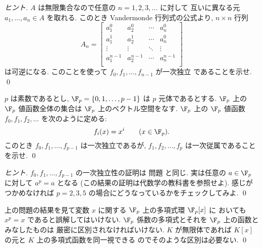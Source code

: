 \documentclass[12pt,twoside]{jarticle}
\begin{document}
\begin{proof}[ヒント]
  $A$ は無限集合なので任意の $n=1,2,3,\ldots$ に対して
  互いに異なる元 $a_1,\ldots,a_n\in A$ を取れる.
  このとき Vandermonde 行列式の公式より, $n\times n$ 行列
  \begin{equation*}
    A_n = 
    \begin{bmatrix}
      a_1^0     & a_2^0     & \cdots & a_n^0     \\
      a_1^1     & a_2^1     & \cdots & a_n^0     \\
      \vdots    & \vdots    & \ddots & \vdots    \\
      a_1^{n-1} & a_2^{n-1} & \cdots & a_n^{n-1} \\
    \end{bmatrix}
  \end{equation*}
  は可逆になる. このことを使って $f_0,f_1,\ldots,f_{n-1}$ が一次独立
  であることを示せ. \qed
\end{proof}

\begin{question}[15点]
  $p$ は素数であるとし, $\F_p=\{0,1,\ldots,p-1\}$ は $p$ 元体であるとする.
  $\F_p$ 上の $\F_p$ 値函数全体の集合は $\F_p$ 上のベクトル空間をなす.
  $\F_p$ 上の $\F_p$ 値函数 $f_0,f_1,f_2,\ldots$ を次のように定める:
  \begin{equation*}
    f_i(x) = x^i \qquad (x\in\F_p).
  \end{equation*}
  このとき $f_0,f_1,\ldots,f_{p-1}$ は一次独立であるが, %
  $f_1,f_2,\ldots,f_p$ は一次従属であることを示せ.
  \qed
\end{question}

\begin{proof}[ヒント]
  $f_0,f_1,\ldots,f_{p-1}$ の一次独立性の証明は
  問題  と同じ.
  実は任意の $a\in\F_p$ に対して $a^p=a$ となる
  (この結果の証明は代数学の教科書を参照せよ).
  感じがつかめなければ $p=2,3,5$ の場合にどうなっているかをチェックしてみよ.
  \qed
\end{proof}

\begin{rem}
  上の問題の結果を見て変数 $x$ に関する $\F_p$ 上の多項式環 $\F_p[x]$ に
  おいても $x^p=x$ であると誤解してはいけない. 
  $\F_p$ 係数の多項式とそれを $\F_p$ 上の函数とみなしたものは
  厳密に区別されなければいけない.
  $K$ が無限体であれば $K[x]$ の元と $K$ 上の多項式函数を同一視できる
  のでそのような区別は必要ない.
  \qed
\end{rem}

\end{document}

